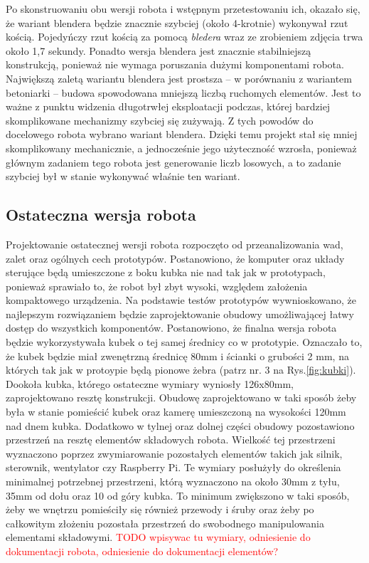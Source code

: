 Po skonstruowaniu obu wersji robota i wstępnym przetestowaniu ich, okazało się, że wariant blendera będzie znacznie szybciej (około 4-krotnie) wykonywał rzut kością.
Pojedyńczy rzut kością za pomocą \textit{bledera} wraz ze zrobieniem zdjęcia trwa około 1,7 sekundy.
Ponadto wersja blendera jest znacznie stabilniejszą konstrukcją, ponieważ nie wymaga poruszania dużymi komponentami robota. 
Największą zaletą wariantu blendera jest prostsza -- w porównaniu z wariantem betoniarki -- budowa spowodowana mniejszą liczbą ruchomych elementów. Jest to ważne z punktu widzenia
długotrwłej eksploatacji podczas, której bardziej skomplikowane mechanizmy szybciej się zużywają. Z tych powodów do docelowego robota wybrano 
wariant blendera. Dzięki temu projekt stał się mniej skomplikowany mechanicznie, a jednocześnie jego użyteczność wzrosła, ponieważ
głównym zadaniem tego robota jest generowanie liczb losowych, a to zadanie szybciej był w stanie wykonywać właśnie ten wariant.


\subsection{Ostateczna wersja robota}
Projektowanie ostatecznej wersji robota rozpoczęto od przeanalizowania wad, zalet oraz ogólnych cech prototypów. Postanowiono, że komputer oraz układy sterujące będą
umieszczone z boku kubka nie nad tak jak w prototypach, ponieważ sprawiało to, że robot był zbyt wysoki, względem założenia kompaktowego urządzenia.
Na podstawie testów prototypów wywnioskowano, że najlepszym rozwiązaniem będzie zaprojektowanie obudowy umożliwającej łatwy dostęp do wszystkich komponentów.
Postanowiono, że finalna wersja robota będzie wykorzystywała kubek o tej samej średnicy co w prototypie. Oznaczało to, że kubek będzie miał zwenętrzną średnicę 80mm
i ścianki o grubości 2 mm, na których tak jak w protoypie będą pionowe żebra (patrz nr. 3 na Rys.\ref{fig:kubki}). Dookoła kubka, którego ostateczne wymiary wyniosły 126x80mm,
zaprojektowano resztę konstrukcji. Obudowę zaprojektowano w taki sposób żeby była w stanie pomieścić kubek oraz kamerę umieszczoną na wysokości 120mm nad dnem kubka.
Dodatkowo w tylnej oraz dolnej części obudowy pozostawiono przestrzeń na resztę
elementów składowych robota. Wielkość tej przestrzeni wyznaczono poprzez zwymiarowanie pozostałych elementów takich jak silnik, sterownik, wentylator 
czy Raspberry Pi. Te wymiary posłużyły do określenia minimalnej potrzebnej przestrzeni, którą wyznaczono na około 30mm z tyłu, 35mm od dołu oraz 10 od góry kubka. To minimum 
zwiększono w taki sposób, żeby we wnętrzu pomieściły się również przewody i śruby oraz żeby po całkowitym złożeniu pozostała przestrzeń do swobodnego manipulowania
elementami składowymi. \textcolor{red}{TODO wpisywac tu wymiary, odniesienie do dokumentacji robota, odniesienie do dokumentacji elementów?}

